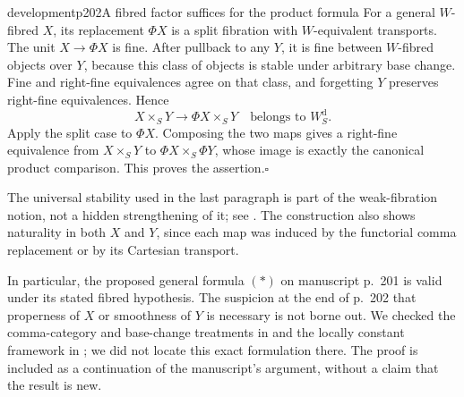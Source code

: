 \begin{dcomment}{development}{p202}{A fibred factor suffices for the product formula}
For a general $W$-fibred $X$, its replacement $\Phi X$ is a split fibration with $W$-equivalent transports. The unit $X\to\Phi X$ is fine. After pullback to any $Y$, it is fine between $W$-fibred objects over $Y$, because this class of objects is stable under arbitrary base change. Fine and right-fine equivalences agree on that class, and forgetting $Y$ preserves right-fine equivalences. Hence
\[
 X\times_S Y\longrightarrow\Phi X\times_S Y
       \quad\text{belongs to }W_S^{\mathrm d}.
\]
Apply the split case to $\Phi X$. Composing the two maps gives a right-fine equivalence from $X\times_S Y$ to $\Phi X\times_S\Phi Y$, whose image is exactly the canonical product comparison. This proves the assertion.\hfill$\square$

The universal stability used in the last paragraph is part of the weak-fibration notion, not a hidden strengthening of it; see \citet[Chapter~XII, Part~III, Theorem~3, manuscript pp.~51--52]{Grothendieck1990XIIa}. The construction also shows naturality in both $X$ and $Y$, since each map was induced by the functorial comma replacement or by its Cartesian transport.

In particular, the proposed general formula $(*)$ on manuscript p.~201 is valid under its stated fibred hypothesis. The suspicion at the end of p.~202 that properness of $X$ or smoothness of $Y$ is necessary is not borne out. We checked the comma-category and base-change treatments in \citet[\S\S4--5]{Maltsiniotis2005Asphericite} and the locally constant framework in \citet{Cisinski2009LocallyConstant}; we did not locate this exact formulation there. The proof is included as a continuation of the manuscript's argument, without a claim that the result is new.
\end{dcomment}

